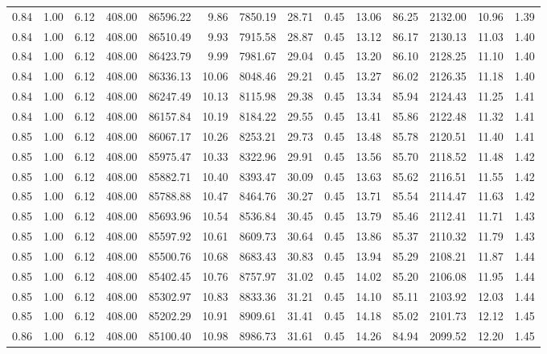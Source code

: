 \begin{table}[!ht]
\begin{tabular}{rrrrrrrrrrrrrr}
0.84 & 1.00 & 6.12 & 408.00 & 86596.22 & 9.86 & 7850.19 & 28.71 & 0.45 & 13.06 & 86.25 & 2132.00 & 10.96 & 1.39 \\
0.84 & 1.00 & 6.12 & 408.00 & 86510.49 & 9.93 & 7915.58 & 28.87 & 0.45 & 13.12 & 86.17 & 2130.13 & 11.03 & 1.40 \\
0.84 & 1.00 & 6.12 & 408.00 & 86423.79 & 9.99 & 7981.67 & 29.04 & 0.45 & 13.20 & 86.10 & 2128.25 & 11.10 & 1.40 \\
0.84 & 1.00 & 6.12 & 408.00 & 86336.13 & 10.06 & 8048.46 & 29.21 & 0.45 & 13.27 & 86.02 & 2126.35 & 11.18 & 1.40 \\
0.84 & 1.00 & 6.12 & 408.00 & 86247.49 & 10.13 & 8115.98 & 29.38 & 0.45 & 13.34 & 85.94 & 2124.43 & 11.25 & 1.41 \\
0.84 & 1.00 & 6.12 & 408.00 & 86157.84 & 10.19 & 8184.22 & 29.55 & 0.45 & 13.41 & 85.86 & 2122.48 & 11.32 & 1.41 \\
0.85 & 1.00 & 6.12 & 408.00 & 86067.17 & 10.26 & 8253.21 & 29.73 & 0.45 & 13.48 & 85.78 & 2120.51 & 11.40 & 1.41 \\
0.85 & 1.00 & 6.12 & 408.00 & 85975.47 & 10.33 & 8322.96 & 29.91 & 0.45 & 13.56 & 85.70 & 2118.52 & 11.48 & 1.42 \\
0.85 & 1.00 & 6.12 & 408.00 & 85882.71 & 10.40 & 8393.47 & 30.09 & 0.45 & 13.63 & 85.62 & 2116.51 & 11.55 & 1.42 \\
0.85 & 1.00 & 6.12 & 408.00 & 85788.88 & 10.47 & 8464.76 & 30.27 & 0.45 & 13.71 & 85.54 & 2114.47 & 11.63 & 1.42 \\
0.85 & 1.00 & 6.12 & 408.00 & 85693.96 & 10.54 & 8536.84 & 30.45 & 0.45 & 13.79 & 85.46 & 2112.41 & 11.71 & 1.43 \\
0.85 & 1.00 & 6.12 & 408.00 & 85597.92 & 10.61 & 8609.73 & 30.64 & 0.45 & 13.86 & 85.37 & 2110.32 & 11.79 & 1.43 \\
0.85 & 1.00 & 6.12 & 408.00 & 85500.76 & 10.68 & 8683.43 & 30.83 & 0.45 & 13.94 & 85.29 & 2108.21 & 11.87 & 1.44 \\
0.85 & 1.00 & 6.12 & 408.00 & 85402.45 & 10.76 & 8757.97 & 31.02 & 0.45 & 14.02 & 85.20 & 2106.08 & 11.95 & 1.44 \\
0.85 & 1.00 & 6.12 & 408.00 & 85302.97 & 10.83 & 8833.36 & 31.21 & 0.45 & 14.10 & 85.11 & 2103.92 & 12.03 & 1.44 \\
0.85 & 1.00 & 6.12 & 408.00 & 85202.29 & 10.91 & 8909.61 & 31.41 & 0.45 & 14.18 & 85.02 & 2101.73 & 12.12 & 1.45 \\
0.86 & 1.00 & 6.12 & 408.00 & 85100.40 & 10.98 & 8986.73 & 31.61 & 0.45 & 14.26 & 84.94 & 2099.52 & 12.20 & 1.45 \\

\end{tabular}
\end{table}
